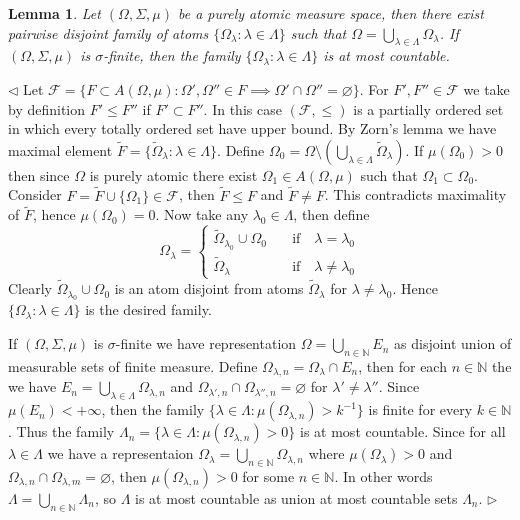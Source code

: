 \documentclass[12pt]{article}
\newtheorem{lemma}[theorem]{Lemma}
\newenvironment{proof}{\par $\triangleleft$}{$\triangleright$}
\begin{document}
\begin{lemma}\label{PureAtomSpDecomp} Let $(\Omega,\Sigma,\mu)$ be a purely atomic measure space, then there exist pairwise disjoint family of atoms $\{\Omega_\lambda:\lambda\in\Lambda\}$ such that
$\Omega=\bigcup_{\lambda\in\Lambda}\Omega_\lambda$. If $(\Omega,\Sigma,\mu)$ is $\sigma$-finite, then the family $\{\Omega_\lambda:\lambda\in\Lambda\}$ is at most countable.
\end{lemma}
\begin{proof}
Let $\mathcal{F}=\{F\subset A(\Omega,\mu):\Omega',\Omega''\in F\implies \Omega'\cap\Omega''=\varnothing\}$. For $F',F''\in\mathcal{F}$ we take by definition $F'\leq F''$ if $F'\subset F''$. In this case $(\mathcal{F},\leq)$ is a partially ordered set in which every totally ordered set have upper bound. By Zorn's lemma we have maximal element $\widetilde{F}=\{\widetilde{\Omega}_\lambda:\lambda\in\Lambda\}$. Define $\Omega_0=\Omega\setminus(\bigcup_{\lambda\in\Lambda}\widetilde{\Omega}_\lambda)$. If $\mu(\Omega_0)>0$ then since $\Omega$ is purely atomic there exist $\Omega_1\in A(\Omega,\mu)$ such that $\Omega_1\subset\Omega_0$. Consider $F=\widetilde{F}\cup \{\Omega_1\}\in\mathcal{F}$, then $\widetilde{F}\leq F$ and $\widetilde{F}\neq F$. This contradicts maximality of $\widetilde{F}$, hence $\mu(\Omega_0)=0$. Now take any $\lambda_0\in\Lambda$, then define
$$
\Omega_\lambda=
\begin{cases}
\widetilde{\Omega}_{\lambda_0}\cup\Omega_0\quad&\text{if}\quad\lambda=\lambda_0\\
\widetilde{\Omega}_\lambda            \quad&\text{if}\quad\lambda\neq\lambda_0
\end{cases}
$$
Clearly $\widetilde{\Omega}_{\lambda_0}\cup\Omega_0$ is an atom disjoint from atoms $\widetilde{\Omega}_\lambda$ for $\lambda\neq\lambda_0$. Hence $\{\Omega_\lambda:\lambda\in\Lambda\}$ is the desired family.

If $(\Omega,\Sigma,\mu)$ is $\sigma$-finite we have representation $\Omega=\bigcup_{n\in\mathbb{N}}E_n$ as disjoint union of measurable sets of finite measure. Define $\Omega_{\lambda, n}=\Omega_\lambda\cap E_n$, then for each $n\in\mathbb{N}$ the we have $E_n=\bigcup_{\lambda\in\Lambda}\Omega_{\lambda,n}$ and $\Omega_{\lambda',n}\cap\Omega_{\lambda'',n}=\varnothing$ for $\lambda'\neq\lambda''$. Since $\mu(E_n)<+\infty$, then the family $\{\lambda\in\Lambda:\mu(\Omega_{\lambda,n})>k^{-1}\}$ is finite for every $k\in\mathbb{N}$. Thus the family $\Lambda_n=\{\lambda\in\Lambda:\mu(\Omega_{\lambda,n})>0\}$ is at most countable. Since for all $\lambda\in\Lambda$ we have a representaion $\Omega_\lambda=\bigcup_{n\in\mathbb{N}}\Omega_{\lambda,n}$ where $\mu(\Omega_\lambda)>0$ and $\Omega_{\lambda,n}\cap\Omega_{\lambda,m}=\varnothing$, then $\mu(\Omega_{\lambda,n})>0$ for some $n\in\mathbb{N}$. In other words $\Lambda=\bigcup_{n\in\mathbb{N}}\Lambda_n$, so $\Lambda$ is at most countable as union at most countable sets $\Lambda_n$.
\end{proof}
\end{document}
